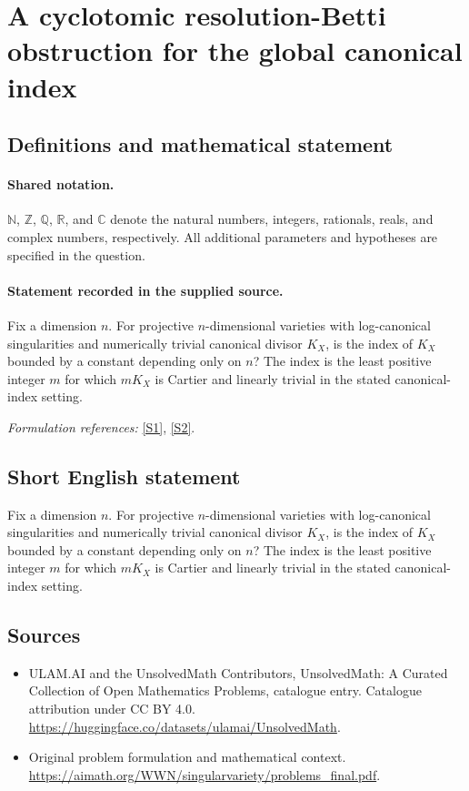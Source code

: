 \documentclass[11pt]{article}
\newcommand{\sref}[2]{\hyperlink{source:#1:#2}{[S#2]}}
\begin{document}
\section{A cyclotomic resolution-Betti obstruction for the global canonical index}\label{statement}

\subsection{Definitions and mathematical statement}

\paragraph{Shared notation.}$\mathbb N$, $\mathbb Z$, $\mathbb Q$, $\mathbb R$, and $\mathbb C$ denote the natural numbers, integers, rationals, reals, and complex numbers, respectively. All additional parameters and hypotheses are specified in the question.


\paragraph{Statement recorded in the supplied source.}
Fix a dimension $n$. For projective $n$-dimensional varieties with log-canonical singularities and numerically trivial canonical divisor $K_X$, is the index of $K_X$ bounded by a constant depending only on $n$? The index is the least positive integer $m$ for which $mK_X$ is Cartier and linearly trivial in the stated canonical-index setting.
\par\smallskip\textit{Formulation references:} \sref{statement}{1}, \sref{statement}{2}.
\subsection{Short English statement}
Fix a dimension $n$. For projective $n$-dimensional varieties with log-canonical singularities and numerically trivial canonical divisor $K_X$, is the index of $K_X$ bounded by a constant depending only on $n$? The index is the least positive integer $m$ for which $mK_X$ is Cartier and linearly trivial in the stated canonical-index setting.
\subsection{Sources}
\begin{itemize}
\item[\hypertarget{source:statement:1}{S1}] ULAM.AI and the UnsolvedMath Contributors, UnsolvedMath: A Curated Collection of Open Mathematics Problems, catalogue entry. Catalogue attribution under CC BY 4.0.
\url{https://huggingface.co/datasets/ulamai/UnsolvedMath}.
\item[\hypertarget{source:statement:2}{S2}] Original problem formulation and mathematical context.
\url{https://aimath.org/WWN/singularvariety/problems_final.pdf}.
\end{itemize}
\label{end:statement}
\end{document}
